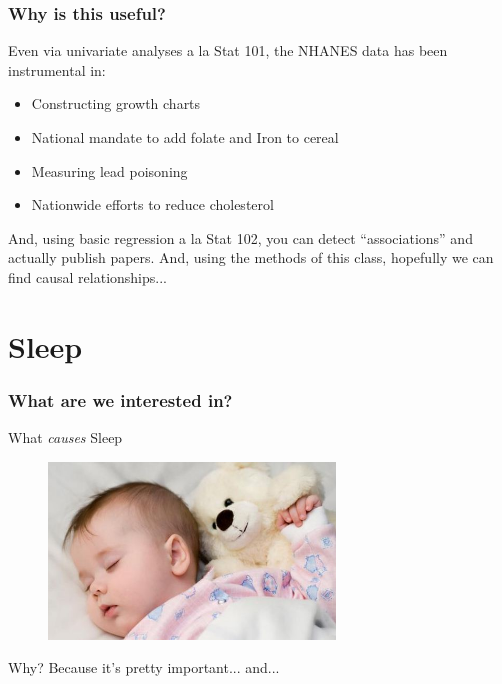 \documentclass[presentation]{beamer}
\begin{document}
\begin{frame}
	\frametitle{Why is this useful?}

Even via univariate analyses a la Stat 101, the NHANES data has been instrumental in: \pause

\begin{itemize}
\item Constructing growth charts
\item National mandate to add folate and Iron to cereal
\item Measuring lead poisoning
\item Nationwide efforts to reduce cholesterol
\end{itemize}

\pause

And, using basic regression a la Stat 102, you can detect ``associations'' and actually publish papers. \pause And, using the methods of this class, hopefully we can find causal relationships...

\end{frame}

\section{Sleep}

\begin{frame}
	\frametitle{What are we interested in?}

\pause

\begin{center}
What \textit{causes} \Huge{ Sleep}
\end{center}

\begin{figure}[htp]
\centering
\includegraphics[width=3in]{sleep.jpg}
\end{figure}
\FloatBarrier

Why? \pause Because it's pretty important... and...

\end{frame}
\end{document}
